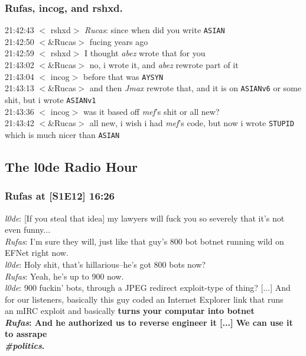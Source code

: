 \documentclass{article}
\begin{document}
\subsubsection{Rufas, incog, and rshxd.}\label{Rufas, incog, and rshxd.}
21:42:43 $<$ rshxd$>$ \emph{Rucas}: since when did you write {\tt ASIAN}\\
21:42:50 $<$\&Rucas$>$ fucing years ago\\
21:42:59 $<$ rshxd$>$ I thought \emph{abez} wrote that for you\\
21:43:02 $<$\&Rucas$>$ no, i wrote it, and \emph{abez} rewrote part of it\\
21:43:04 $<$ incog$>$ before that was {\tt AYSYN}\\
21:43:13 $<$\&Rucas$>$ and then \emph{Jmax} rewrote that, and it is on {\tt ASIANv6} or some\\\indent shit, but i wrote {\tt ASIANv1}\\
21:43:36 $<$ incog$>$ was it based off \emph{mef}'s shit or all new?\\
21:43:42 $<$\&Rucas$>$ all new, i wish i had \emph{mef}'s code, but now i wrote {\tt STUPID}\\\indent which is much nicer than {\tt ASIAN}
\subsection{The l0de Radio Hour}\label{The l0de Radio Hour}
\subsubsection{Rufas at [S1E12] 16:26}\label{Rufas at [S1E12] 16:26}
\emph{l0de}: [If you steal that idea] my lawyers will fuck you so severely that it's not\\\indent even funny...\\
\emph{Rufas}: I'm sure they will, just like that guy's 800 bot botnet running wild on\\\indent EFNet right now.\\
\emph{l0de}: Holy shit, that's hillarious--he's got 800 bots now?\\
\emph{Rufas}: Yeah, he's up to 900 now.\\
\emph{l0de}: 900 fuckin' bots, through a JPEG redirect exploit-type of thing? [...] And\\\indent for our listeners, basically this guy coded an Internet Explorer link that runs\\\indent an mIRC exploit and basically \bf{turns your computar into botnet}\rm\\
\emph{Rufas}: And he authorized us to reverse engineer it [...] We can use it to assrape\\\indent \emph{\#politics}.
\end{document}
